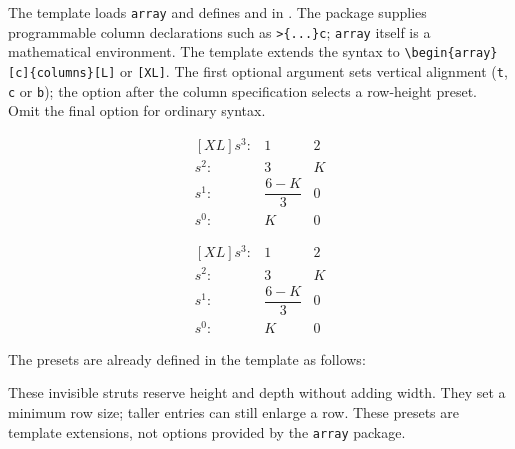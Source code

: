 \begin{referencecode}

\end{referencecode}
The template loads \texttt{array} and defines \texttt{\string\rowL}
and \texttt{\string\rowXL} in
. The package supplies
programmable column declarations such as \verb|>{...}c|;
\texttt{array} itself is a mathematical environment.
The template extends the syntax to
\verb|\begin{array}[c]{columns}[L]| or \texttt{[XL]}.
The first optional argument sets vertical alignment (\texttt{t},
\texttt{c} or \texttt{b}); the option after the column specification
selects a row-height preset. Omit the final option for ordinary syntax.
\begin{referencecode}
\[
\begin{array}{rcc}[XL]
    s^3: & 1 & 2 \\
    s^2: & 3 & K \\
    s^1: & \dfrac{6-K}{3} & 0 \\
    s^0: & K & 0
\end{array}
\]
\end{referencecode}

\[
\begin{array}{rcc}[XL]
    s^3: & 1 & 2 \\
    s^2: & 3 & K \\
    s^1: & \dfrac{6-K}{3} & 0 \\
    s^0: & K & 0
\end{array}
\]

The presets are already defined in the template as follows:
\begin{referencecode}
\newcommand{\rowL}{\vphantom{\dfrac{M}{M}}}
\newcommand{\rowXL}{\vphantom{\dfrac{M^M}{M_M}}}
\end{referencecode}
These invisible struts reserve
height and depth without adding width. They set a minimum row size;
taller entries can still enlarge a row. These presets are template
extensions, not options provided by the \texttt{array} package.

